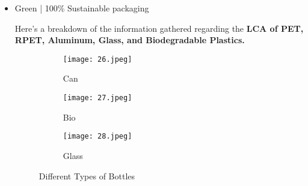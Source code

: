 \documentclass{article}
\begin{document}
\begin{itemize}
  \item Green | 100\% Sustainable packaging 


 Here’s a breakdown of the information gathered regarding the \textbf{LCA of PET, RPET, Aluminum, Glass, and Biodegradable Plastics.} 
\begin{figure}[H]
    \centering
    \begin{subfigure}{0.3\textwidth}
        \centering
        \texttt{[image: 26.jpeg]}
        \caption{Can}
    \end{subfigure}
    \hfill
    \begin{subfigure}{0.3\textwidth}
        \centering
        \texttt{[image: 27.jpeg]}
        \caption{Bio}
    \end{subfigure}
    \hfill
    \begin{subfigure}{0.3\textwidth}
        \centering
        \texttt{[image: 28.jpeg]}
        \caption{Glass}
    \end{subfigure}
    \caption{Different Types of Bottles}
\end{figure}


\end{itemize}
\end{document}
